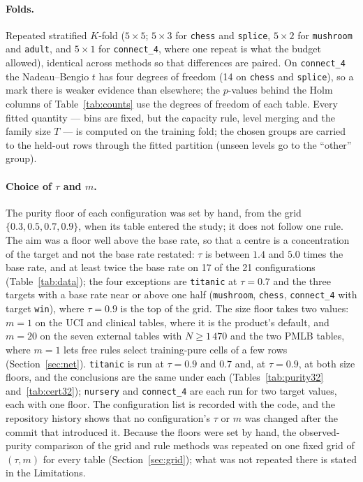 \documentclass[11pt]{article}
\begin{document}
\paragraph{Folds.} Repeated stratified $K$-fold ($5\times5$; $5\times3$ for \texttt{chess} and \texttt{splice}, $5\times2$ for \texttt{mushroom} and \texttt{adult}, and $5\times1$ for \texttt{connect\_4}, where one repeat is what the budget allowed), identical across methods so that differences are paired. On \texttt{connect\_4} the Nadeau--Bengio $t$ has four degrees of freedom (14 on \texttt{chess} and \texttt{splice}), so a mark there is weaker evidence than elsewhere; the $p$-values behind the Holm columns of Table~\ref{tab:counts} use the degrees of freedom of each table. Every fitted quantity --- bins are fixed, but the capacity rule, level merging and the family size $T$ --- is computed on the training fold; the chosen groups are carried to the held-out rows through the fitted partition (unseen levels go to the ``other'' group).

\paragraph{Choice of $\tau$ and $m$.} The purity floor of each configuration was set by hand, from the grid $\{0.3,0.5,0.7,0.9\}$, when its table entered the study; it does not follow one rule. The aim was a floor well above the base rate, so that a centre is a concentration of the target and not the base rate restated: $\tau$ is between $1.4$ and $5.0$ times the base rate, and at least twice the base rate on 17 of the 21 configurations (Table~\ref{tab:data}); the four exceptions are \texttt{titanic} at $\tau=0.7$ and the three targets with a base rate near or above one half (\texttt{mushroom}, \texttt{chess}, \texttt{connect\_4} with target \texttt{win}), where $\tau=0.9$ is the top of the grid. The size floor takes two values: $m=1$ on the UCI and clinical tables, where it is the product's default, and $m=20$ on the seven external tables with $N\ge1\,470$ and the two PMLB tables, where $m=1$ lets free rules select training-pure cells of a few rows (Section~\ref{sec:net}). \texttt{titanic} is run at $\tau=0.9$ and $0.7$ and, at $\tau=0.9$, at both size floors, and the conclusions are the same under each (Tables~\ref{tab:purity32} and~\ref{tab:cert32}); \texttt{nursery} and \texttt{connect\_4} are each run for two target values, each with one floor. The configuration list is recorded with the code, and the repository history shows that no configuration's $\tau$ or $m$ was changed after the commit that introduced it. Because the floors were set by hand, the observed-purity comparison of the grid and rule methods was repeated on one fixed grid of $(\tau,m)$ for every table (Section~\ref{sec:grid}); what was not repeated there is stated in the Limitations.
\end{document}
